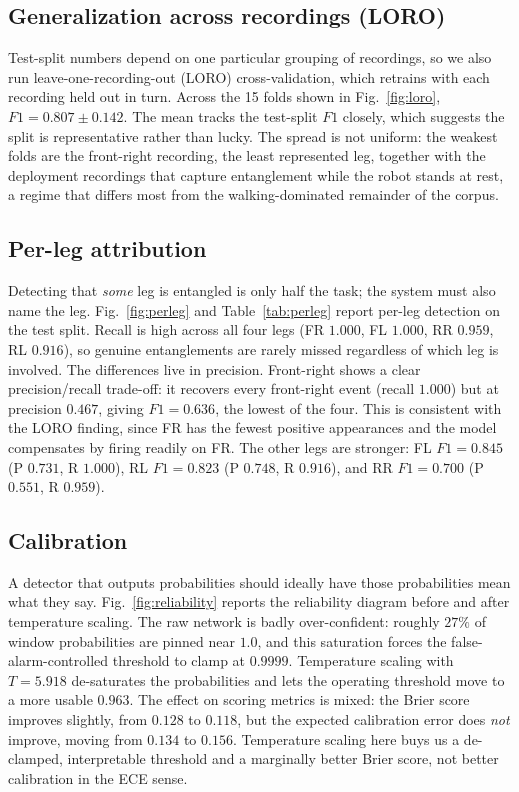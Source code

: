 \subsection{Generalization across recordings (LORO)}
Test-split numbers depend on one particular grouping of recordings, so we also run leave-one-recording-out (LORO) cross-validation, which retrains with each recording held out in turn. Across the 15 folds shown in Fig.~\ref{fig:loro}, $F1 = 0.807 \pm 0.142$. The mean tracks the test-split $F1$ closely, which suggests the split is representative rather than lucky. The spread is not uniform: the weakest folds are the front-right recording, the least represented leg, together with the deployment recordings that capture entanglement while the robot stands at rest, a regime that differs most from the walking-dominated remainder of the corpus.

\subsection{Per-leg attribution}
Detecting that \emph{some} leg is entangled is only half the task; the system must also name the leg. Fig.~\ref{fig:perleg} and Table~\ref{tab:perleg} report per-leg detection on the test split. Recall is high across all four legs (FR $1.000$, FL $1.000$, RR $0.959$, RL $0.916$), so genuine entanglements are rarely missed regardless of which leg is involved. The differences live in precision. Front-right shows a clear precision/recall trade-off: it recovers every front-right event (recall $1.000$) but at precision $0.467$, giving $F1 = 0.636$, the lowest of the four. This is consistent with the LORO finding, since FR has the fewest positive appearances and the model compensates by firing readily on FR. The other legs are stronger: FL $F1 = 0.845$ (P $0.731$, R $1.000$), RL $F1 = 0.823$ (P $0.748$, R $0.916$), and RR $F1 = 0.700$ (P $0.551$, R $0.959$).

\subsection{Calibration}
A detector that outputs probabilities should ideally have those probabilities mean what they say. Fig.~\ref{fig:reliability} reports the reliability diagram before and after temperature scaling. The raw network is badly over-confident: roughly $27\%$ of window probabilities are pinned near $1.0$, and this saturation forces the false-alarm-controlled threshold to clamp at $0.9999$. Temperature scaling with $T = 5.918$ de-saturates the probabilities and lets the operating threshold move to a more usable $0.963$. The effect on scoring metrics is mixed: the Brier score improves slightly, from $0.128$ to $0.118$, but the expected calibration error does \emph{not} improve, moving from $0.134$ to $0.156$. Temperature scaling here buys us a de-clamped, interpretable threshold and a marginally better Brier score, not better calibration in the ECE sense.

